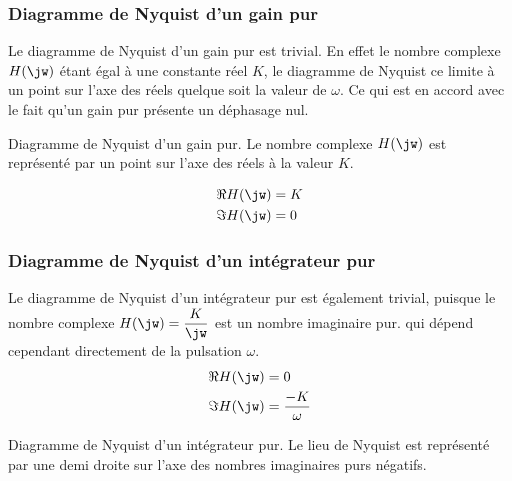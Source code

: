 \subsubsection{Diagramme de Nyquist d'un gain pur}
Le diagramme de Nyquist d'un gain pur est trivial. En effet le nombre complexe 
$H(\jw)$ étant égal à une constante réel $K$, le diagramme de Nyquist ce 
limite à un point sur l'axe des réels quelque soit la valeur de $\omega$.
Ce qui est en accord avec le fait qu'un gain pur présente un déphasage nul.
\begin{marginfigure}
    \centering
    \resizebox{\linewidth}{!}{}
    \caption{Diagramme de Nyquist d'un gain pur. Le nombre complexe $H(\jw)$ 
             est représenté par un point sur l'axe des réels à la valeur $K$. 
             \label{fig-nyquist_1}}
\end{marginfigure}
\begin{align*}
    \Re{H(\jw)}&=K\\
    \Im{H(\jw)}&=0\\
\end{align*}
\subsubsection{Diagramme de Nyquist d'un intégrateur pur}
Le diagramme de Nyquist d'un intégrateur pur est également trivial, puisque 
le nombre complexe $H(\jw)=\dfrac{K}{\jw}$ est un nombre imaginaire pur. 
qui dépend cependant directement de la pulsation $\omega$. 
\begin{align*}
    \Re{H(\jw)}&=0\\
    \Im{H(\jw)}&=\dfrac{-K}{\omega}
\end{align*}
\begin{marginfigure}
    \centering
    \resizebox{\linewidth}{!}{}
    \caption{Diagramme de Nyquist d'un intégrateur pur. Le lieu de Nyquist 
             est représenté par une demi droite sur l'axe des nombres 
             imaginaires purs négatifs.\label{fig-nyquist_2}}
\end{marginfigure}
\newpage
